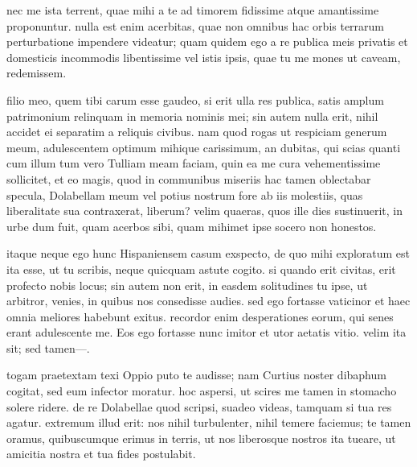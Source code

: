  nec me ista terrent, quae mihi a te ad timorem fidissime atque amantissime proponuntur. nulla est enim acerbitas, quae non omnibus hac orbis terrarum perturbatione impendere videatur; quam quidem ego a re publica meis privatis et domesticis incommodis libentissime vel istis ipsis, quae tu me mones ut caveam, redemissem.

 filio meo, quem tibi carum esse gaudeo, si erit ulla res publica, satis amplum patrimonium relinquam in memoria nominis mei; sin autem nulla erit, nihil accidet ei separatim a reliquis civibus. nam quod rogas ut respiciam generum meum, adulescentem optimum mihique carissimum, an dubitas, qui scias quanti cum illum tum vero Tulliam meam faciam, quin ea me cura vehementissime sollicitet, et eo magis, quod in communibus miseriis hac tamen oblectabar specula, Dolabellam meum vel potius nostrum fore ab iis molestiis, quas liberalitate sua contraxerat, liberum? velim quaeras, quos ille dies sustinuerit, in urbe dum fuit, quam acerbos sibi, quam mihimet ipse socero non honestos.

 itaque neque ego hunc Hispaniensem casum exspecto, de quo mihi exploratum est ita esse, ut tu scribis, neque quicquam astute cogito. si quando erit civitas, erit profecto nobis locus; sin autem non erit, in easdem solitudines tu ipse, ut arbitror, venies, in quibus nos consedisse audies. sed ego fortasse vaticinor et haec omnia meliores habebunt exitus. recordor enim desperationes eorum, qui senes erant adulescente me. Eos ego fortasse nunc imitor et utor aetatis vitio. velim ita sit; sed tamen—.

 togam praetextam texi Oppio puto te audisse; nam Curtius noster dibaphum cogitat, sed eum infector moratur. hoc aspersi, ut scires me tamen in stomacho solere ridere. de re Dolabellae quod scripsi, suadeo videas, tamquam si tua res agatur. extremum illud erit: nos nihil turbulenter, nihil temere faciemus; te tamen oramus, quibuscumque erimus in terris, ut nos liberosque nostros ita tueare, ut amicitia nostra et tua fides postulabit.
